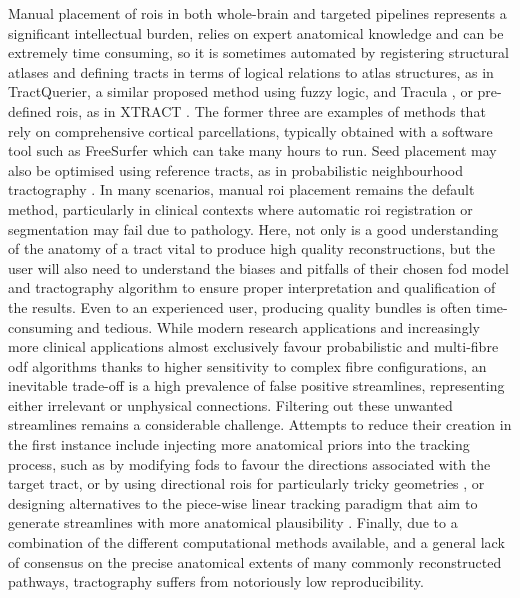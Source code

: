 Manual placement of \glspl{roi} in both whole-brain and targeted pipelines represents a significant intellectual burden, relies on expert anatomical knowledge and can be extremely time consuming, so it is sometimes automated by registering structural atlases and defining tracts in terms of logical relations to atlas structures, as in TractQuerier\autocite{Wassermann2016}, a similar proposed method using fuzzy logic\autocite{Delmonte2019}, and Tracula \autocite{Yendiki2011}, or pre-defined \glspl{roi}, as in XTRACT \autocite{Warrington2020}.
The former three are examples of methods that rely on comprehensive cortical parcellations, typically obtained with a software tool such as FreeSurfer\autocite{Desikan2006,FischlSalat2002} which can take many hours to run.
Seed placement may also be optimised using reference tracts, as in probabilistic neighbourhood tractography \autocite{Clayden2006,Clayden2009}.
In many scenarios, manual \gls{roi} placement remains the default method, particularly in clinical contexts where automatic \gls{roi} registration or segmentation may fail due to pathology.
Here, not only is a good understanding of the anatomy of a tract vital to produce high quality reconstructions, but the user will also need to understand the biases and pitfalls of their chosen \gls{fod} model and tractography algorithm to ensure proper interpretation and qualification of the results\autocite{Rheault2020,Rheault2022}.
Even to an experienced user, producing quality bundles is often time-consuming and tedious.
While modern research applications and increasingly more clinical applications almost exclusively favour probabilistic and multi-fibre \gls{odf} algorithms thanks to higher sensitivity to complex fibre configurations\autocite{Yang2021}, an inevitable trade-off is a high prevalence of false positive streamlines, representing either irrelevant or unphysical connections.
Filtering out these unwanted streamlines remains a considerable challenge\autocite{Jorgens2021}.
Attempts to reduce their creation in the first instance include injecting more anatomical priors into the tracking process, such as by modifying \glspl{fod} to favour the directions associated with the target tract\autocite{Rheault2019}, or by using directional \glspl{roi} for particularly tricky geometries \autocite{Chamberland2017}, or designing alternatives to the piece-wise linear tracking paradigm that aim to generate streamlines with more anatomical plausibility \autocite{Schomburg2017,Aydogan2021}.
Finally, due to a combination of the different computational methods available, and a general lack of consensus on the precise anatomical extents of many commonly reconstructed pathways, tractography suffers from notoriously low reproducibility\autocite{Schilling2021a}.

